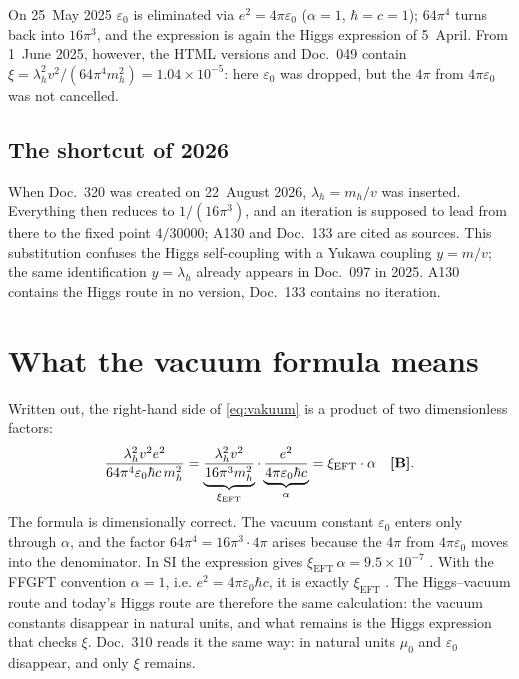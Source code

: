 On 25~May 2025 $\varepsilon_0$ is eliminated via $e^2=4\pi\varepsilon_0$ ($\alpha=1$,
$\hbar=c=1$); $64\pi^4$ turns back into $16\pi^3$, and the expression is again the Higgs
expression of 5~April. From 1~June 2025, however, the HTML versions and Doc.~049 contain
$\xi=\lambda_h^2v^2/(64\pi^4m_h^2)=1.04\times10^{-5}$: here $\varepsilon_0$ was dropped, but the
$4\pi$ from $4\pi\varepsilon_0$ was not cancelled.

\subsection{The shortcut of 2026}

When Doc.~320 was created on 22~August 2026, $\lambda_h=m_h/v$ was inserted. Everything then
reduces to $1/(16\pi^3)$, and an iteration is supposed to lead from there to the fixed point
$4/30000$; A130 and Doc.~133 are cited as sources. This substitution confuses the Higgs
self-coupling with a Yukawa coupling $y=m/v$; the same identification $y=\lambda_h$ already appears
in Doc.~097 in 2025. A130 contains the Higgs route in no version, Doc.~133 contains no iteration.

\section{What the vacuum formula means}

Written out, the right-hand side of \eqref{eq:vakuum} is a product of two dimensionless
factors:
\begin{equation}
  \frac{\lambda_h^2v^2e^2}{64\pi^4\varepsilon_0\hbar c\,m_h^2}
  =\underbrace{\frac{\lambda_h^2v^2}{16\pi^3m_h^2}}_{\xi_{\text{EFT}}}\cdot
   \underbrace{\frac{e^2}{4\pi\varepsilon_0\hbar c}}_{\alpha}
  =\xi_{\text{EFT}}\cdot\alpha\quad\textbf{[B]} .
\end{equation}
The formula is dimensionally correct. The vacuum constant $\varepsilon_0$ enters only through
$\alpha$, and the factor $64\pi^4=16\pi^3\cdot4\pi$ arises because the $4\pi$ from
$4\pi\varepsilon_0$ moves into the denominator. In SI the expression gives
$\xi_{\text{EFT}}\,\alpha=9.5\times10^{-7}$ \KM. With the FFGFT convention $\alpha=1$, i.e.
$e^2=4\pi\varepsilon_0\hbar c$, it is exactly $\xi_{\text{EFT}}$ \BM. The Higgs--vacuum route and
today's Higgs route are therefore the same calculation: the vacuum constants disappear in natural
units, and what remains is the Higgs expression that checks $\xi$. Doc.~310 reads it the same way:
in natural units $\mu_0$ and $\varepsilon_0$ disappear, and only $\xi$ remains.

